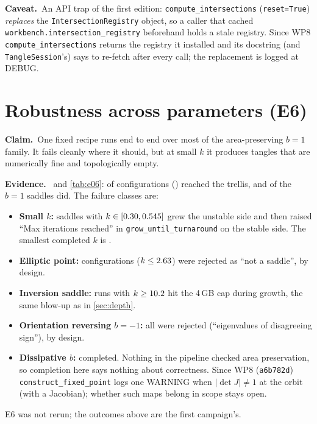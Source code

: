 \documentclass[11pt,a4paper]{article}
\newcommand{\claim}{\par\smallskip\noindent\textbf{Claim.}~}
\newcommand{\evidence}{\par\smallskip\noindent\textbf{Evidence.}~}
\newcommand{\caveat}{\par\smallskip\noindent\textbf{Caveat.}~}
\newcommand{\code}[1]{\texttt{#1}}
\begin{document}
\caveat An API trap of the first edition: \code{compute\_intersections}
(\code{reset=True}) \emph{replaces} the \code{IntersectionRegistry} object,
so a caller that cached \code{workbench.intersection\_registry} beforehand
holds a stale registry. Since WP8 \code{compute\_intersections} returns the
registry it installed and its docstring (and \code{TangleSession}'s) says to
re-fetch after every call; the replacement is logged at DEBUG.

\section{Robustness across parameters (E6)}
\label{sec:robustness}

\claim One fixed recipe runs end to end over most of the area-preserving
$b=1$ family. It fails cleanly where it should, but at small $k$ it produces
tangles that are numerically fine and topologically empty.

\evidence {} and \cref{tab:e06}: \NumSweepComplete{} of
\NumSweepConfigs{} configurations (\NumSweepSuccessFraction) reached the
trellis, and \NumSaddleSuccessFraction{} of the $b=1$ saddles did. The
failure classes are:
\begin{itemize}[leftmargin=*]
\item \textbf{Small $k$:} \NumSweepMaxIterFails{} saddles with
  $k\in[0.30,0.545]$ grew the unstable side
  and then raised ``Max iterations reached'' in \code{grow\_until\_turnaround}
  on the stable side. The smallest completed $k$ is \NumSaddleMinKComplete.
\item \textbf{Elliptic point:} \NumSweepOtherElliptic{} configurations
  ($k\le2.63$) were rejected as ``not a saddle'', by
  design.
\item \textbf{Inversion saddle:} \NumSweepOtherOom{} runs with
  $k\ge10.2$ hit the 4\,GB cap during growth, the same
  blow-up as in \cref{sec:depth}.
\item \textbf{Orientation reversing $b=-1$:} all \NumSweepBMinusOneFails{}
  were rejected (``eigenvalues of disagreeing sign''), by design.
\item \textbf{Dissipative $b$:} \NumSweepDissipativeOk{} completed. Nothing
  in the pipeline checked area preservation, so completion here says nothing
  about correctness. Since WP8 (\code{a6b782d}) \code{construct\_fixed\_point}
  logs one WARNING when $|\det J|\ne1$ at the orbit (with a Jacobian); whether
  such maps belong in scope stays open.
\end{itemize}
E6 was not rerun; the outcomes above are the first campaign's.
\end{document}
